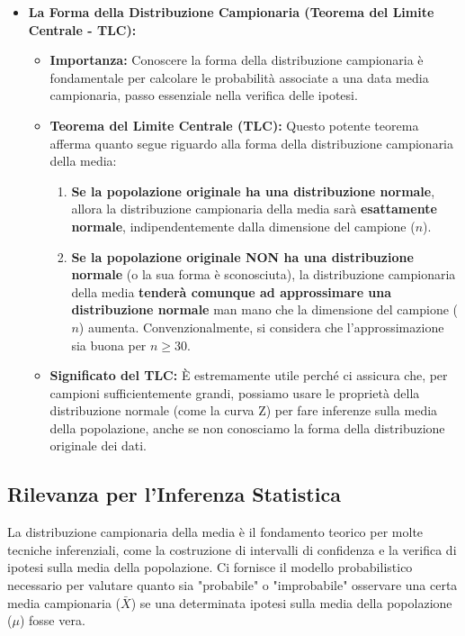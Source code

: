 \documentclass[12pt, a4paper]{article}
\newcommand{\popmean}{\mu} %
\newcommand{\samplemean}{\bar{X}} %
\begin{document}
\begin{itemize}
    \item \textbf{La Forma della Distribuzione Campionaria (Teorema del Limite Centrale - TLC):}
        \begin{itemize}
            \item \textbf{Importanza:} Conoscere la forma della distribuzione campionaria è fondamentale per calcolare le probabilità associate a una data media campionaria, passo essenziale nella verifica delle ipotesi.
            \item \textbf{Teorema del Limite Centrale (TLC):} Questo potente teorema afferma quanto segue riguardo alla forma della distribuzione campionaria della media:
                \begin{enumerate}
                    \item \textbf{Se la popolazione originale ha una distribuzione normale}, allora la distribuzione campionaria della media sarà \textbf{esattamente normale}, indipendentemente dalla dimensione del campione ($n$).
                    \item \textbf{Se la popolazione originale NON ha una distribuzione normale} (o la sua forma è sconosciuta), la distribuzione campionaria della media \textbf{tenderà comunque ad approssimare una distribuzione normale} man mano che la dimensione del campione ($n$) aumenta. Convenzionalmente, si considera che l'approssimazione sia buona per $n \ge 30$.
                \end{enumerate}
            \item \textbf{Significato del TLC:} È estremamente utile perché ci assicura che, per campioni sufficientemente grandi, possiamo usare le proprietà della distribuzione normale (come la curva Z) per fare inferenze sulla media della popolazione, anche se non conosciamo la forma della distribuzione originale dei dati.
        \end{itemize}
\end{itemize}

\subsection*{Rilevanza per l'Inferenza Statistica}
La distribuzione campionaria della media è il fondamento teorico per molte tecniche inferenziali, come la costruzione di intervalli di confidenza e la verifica di ipotesi sulla media della popolazione. Ci fornisce il modello probabilistico necessario per valutare quanto sia "probabile" o "improbabile" osservare una certa media campionaria ($\samplemean$) se una determinata ipotesi sulla media della popolazione ($\popmean$) fosse vera.
\end{document}
